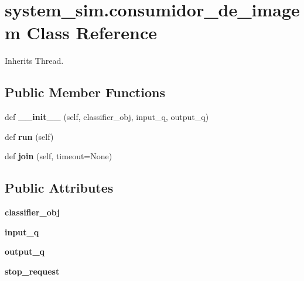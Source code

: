 \hypertarget{classsystem__sim_1_1consumidor__de__imagem}{}\section{system\+\_\+sim.\+consumidor\+\_\+de\+\_\+imagem Class Reference}
\label{classsystem__sim_1_1consumidor__de__imagem}


Inherits Thread.

\subsection*{Public Member Functions}
\begin{DoxyCompactItemize}
\item 
\mbox{\label{classsystem__sim_1_1consumidor__de__imagem_a167d108787839e74a4774ce5635477ef}} 
def {\bfseries \+\_\+\+\_\+init\+\_\+\+\_\+} (self, classifier\+\_\+obj, input\+\_\+q, output\+\_\+q)
\item 
\mbox{\label{classsystem__sim_1_1consumidor__de__imagem_ac084a276d64dc458e2bbcb8672b15bf2}} 
def {\bfseries run} (self)
\item 
\mbox{\label{classsystem__sim_1_1consumidor__de__imagem_acc1d4f14c917da2d809b581b64a46dca}} 
def {\bfseries join} (self, timeout=None)
\end{DoxyCompactItemize}
\subsection*{Public Attributes}
\begin{DoxyCompactItemize}
\item 
\mbox{\label{classsystem__sim_1_1consumidor__de__imagem_afc3231e1cf0bde467a77428455270b29}} 
{\bfseries classifier\+\_\+obj}
\item 
\mbox{\label{classsystem__sim_1_1consumidor__de__imagem_a7d38b1074023b96d32800e821471b6af}} 
{\bfseries input\+\_\+q}
\item 
\mbox{\label{classsystem__sim_1_1consumidor__de__imagem_a80ad55ec2eabdf8f23a8cf8d8d9bcb3f}} 
{\bfseries output\+\_\+q}
\item 
\mbox{\label{classsystem__sim_1_1consumidor__de__imagem_afdbf0c34ccd8b4c9b03d830763d68d1a}} 
{\bfseries stop\+\_\+request}
\end{DoxyCompactItemize}


